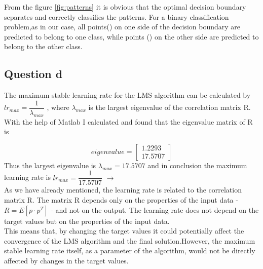 From the figure \ref{fig:patterns} it is obvious that the optimal decision boundary separates and correctly classifies the patterns. For a binary classification problem,as in our case, all points(\color{red}{*}\color{black}) on one side of the decision boundary are predicted to belong to one class, while points (\color{blue}{x}\color{black}) on the other side are predicted to belong to the other class.\\

\subsection{Question d}
The maximum stable learning rate for the LMS algorithm can be calculated by
$lr_{max} = \dfrac{1}{\lambda_{max}}$ , where ${\lambda_{max}}$ is the largest eigenvalue of the correlation matrix R. With the help of Matlab I calculated and found that the eigenvalue matrix of R is 

 \[
 eigenvalue = \left[
\begin{array}{c}  
	1.2293 \\
	17.5707  
\end{array}
\right]
\]
Thus the largest eigenvalue is ${\lambda_{max}} = 17.5707$ and in conclusion the maximum learning rate is $lr_{max} = \dfrac{1}{17.5707}$ $\rightarrow$ 
\\

As we have already mentioned, the learning rate is related to the correlation matrix R. The matrix R depends only on the properties of the input data -$R = E[p \cdot p^T]$ - and not on the output. The learning rate does not depend on the target values but on the properties of the input data.\\
This means that, by changing the target values it could potentially affect the convergence of the LMS algorithm and the final solution.However, the maximum stable learning rate itself, as a parameter of the algorithm, would not be directly affected by changes in the target values.\\

\vspace{2mm}

